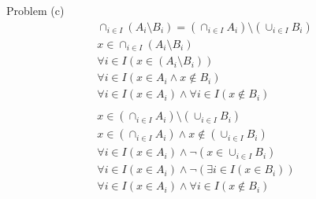 Problem (c)
\begin{align*}
  \cap_{i \in I}(A_i \setminus B_i) = (\cap_{i \in I}A_i) \setminus (\cup_{i \in I}B_i)\\
  x \in \cap_{i \in I}(A_i \setminus B_i) \\
  \forall i \in I(x \in (A_i \setminus B_i)) \\
  \forall i \in I(x \in A_i \land x \notin B_i)\\
  \forall i \in I(x \in A_i) \land \forall i \in I(x \notin B_i)\\\\
  x \in (\cap_{i \in I}A_i) \setminus (\cup_{i \in I}B_i)\\
  x \in (\cap_{i \in I}A_i) \land x \notin (\cup_{i \in I}B_i) \\
  \forall i \in I(x \in A_i) \land \neg (x \in \cup_{i \in I}B_i) \\
  \forall i \in I(x \in A_i) \land \neg (\exists i \in I(x \in B_i)) \\
  \forall i \in I(x \in A_i) \land \forall i \in I (x \notin B_i)
\end{align*}

